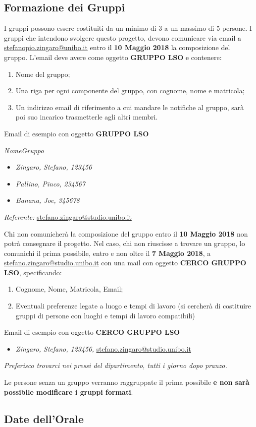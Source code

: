 \subsection{Formazione dei Gruppi}
%
I gruppi possono essere costituiti da un minimo di 3 a un massimo di 5 persone. 
I gruppi che intendono svolgere questo progetto, devono comunicare via email a \url{stefanopio.zingaro@unibo.it} entro il \textbf{10 Maggio 2018} la composizione del gruppo. 
L'email deve avere come oggetto \textbf{GRUPPO LSO} e contenere:
\begin{enumerate}
    \item Nome del gruppo;
    \item Una riga per ogni componente del gruppo, con cognome, nome e matricola;
    \item Un indirizzo email di riferimento a cui mandare le notifiche al gruppo, sarà poi suo incarico trasmetterle agli altri membri.
\end{enumerate}
Email di esempio con oggetto \textbf{GRUPPO LSO}

\noindent\textit{NomeGruppo}
\begin{itemize}
    \item \textit{Zingaro, Stefano, 123456}
    \item \textit{Pallino, Pinco, 234567}
    \item \textit{Banana, Joe, 345678}
\end{itemize}
\textit{Referente:} \url{stefano.zingaro@studio.unibo.it}

Chi non comunicherà la composizione del gruppo entro il \textbf{10 Maggio 2018} non potrà consegnare il progetto. 
Nel caso, chi non riuscisse a trovare un gruppo, lo comunichi il prima possibile, entro e non oltre il \textbf{7 Maggio 2018}, a \url{stefano.zingaro@studio.unibo.it} con una mail con oggetto \textbf{CERCO GRUPPO LSO}, specificando:
\begin{enumerate}
    \item Cognome, Nome, Matricola, Email;
    \item Eventuali preferenze legate a luogo e tempi di lavoro (si cercherà di costituire gruppi di persone con luoghi e tempi di lavoro compatibili)
\end{enumerate}
Email di esempio con oggetto \textbf{CERCO GRUPPO LSO} 
\begin{itemize}
    \item \textit{Zingaro, Stefano, 123456,} \url{stefano.zingaro@studio.unibo.it}
\end{itemize}
\textit{Preferisco trovarci nei pressi del dipartimento, tutti i giorno dopo pranzo.}

Le persone senza un gruppo verranno raggruppate il prima possibile \textbf{e non sarà possibile modificare i gruppi formati}.
%
\subsection{Date dell'Orale}
%